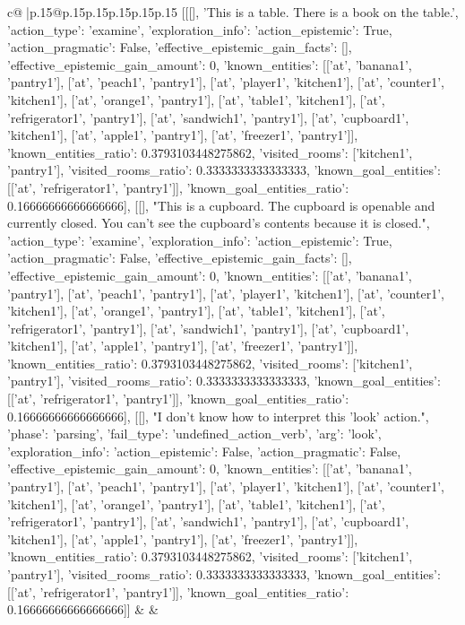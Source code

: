 \documentclass{article}
\begin{document}
{\begin{supertabular}{c@{$\;$}|p{.15\linewidth}@{}p{.15\linewidth}p{.15\linewidth}p{.15\linewidth}p{.15\linewidth}p{.15\linewidth}}
{{{	 [[[], 'This is a table. There is a book on the table.', {'action_type': 'examine', 'exploration_info': {'action_epistemic': True, 'action_pragmatic': False, 'effective_epistemic_gain_facts': [], 'effective_epistemic_gain_amount': 0, 'known_entities': [['at', 'banana1', 'pantry1'], ['at', 'peach1', 'pantry1'], ['at', 'player1', 'kitchen1'], ['at', 'counter1', 'kitchen1'], ['at', 'orange1', 'pantry1'], ['at', 'table1', 'kitchen1'], ['at', 'refrigerator1', 'pantry1'], ['at', 'sandwich1', 'pantry1'], ['at', 'cupboard1', 'kitchen1'], ['at', 'apple1', 'pantry1'], ['at', 'freezer1', 'pantry1']], 'known_entities_ratio': 0.3793103448275862, 'visited_rooms': ['kitchen1', 'pantry1'], 'visited_rooms_ratio': 0.3333333333333333, 'known_goal_entities': [['at', 'refrigerator1', 'pantry1']], 'known_goal_entities_ratio': 0.16666666666666666}}], [[], "This is a cupboard. The cupboard is openable and currently closed. You can't see the cupboard's contents because it is closed.", {'action_type': 'examine', 'exploration_info': {'action_epistemic': True, 'action_pragmatic': False, 'effective_epistemic_gain_facts': [], 'effective_epistemic_gain_amount': 0, 'known_entities': [['at', 'banana1', 'pantry1'], ['at', 'peach1', 'pantry1'], ['at', 'player1', 'kitchen1'], ['at', 'counter1', 'kitchen1'], ['at', 'orange1', 'pantry1'], ['at', 'table1', 'kitchen1'], ['at', 'refrigerator1', 'pantry1'], ['at', 'sandwich1', 'pantry1'], ['at', 'cupboard1', 'kitchen1'], ['at', 'apple1', 'pantry1'], ['at', 'freezer1', 'pantry1']], 'known_entities_ratio': 0.3793103448275862, 'visited_rooms': ['kitchen1', 'pantry1'], 'visited_rooms_ratio': 0.3333333333333333, 'known_goal_entities': [['at', 'refrigerator1', 'pantry1']], 'known_goal_entities_ratio': 0.16666666666666666}}], [[], "I don't know how to interpret this 'look' action.", {'phase': 'parsing', 'fail_type': 'undefined_action_verb', 'arg': 'look', 'exploration_info': {'action_epistemic': False, 'action_pragmatic': False, 'effective_epistemic_gain_amount': 0, 'known_entities': [['at', 'banana1', 'pantry1'], ['at', 'peach1', 'pantry1'], ['at', 'player1', 'kitchen1'], ['at', 'counter1', 'kitchen1'], ['at', 'orange1', 'pantry1'], ['at', 'table1', 'kitchen1'], ['at', 'refrigerator1', 'pantry1'], ['at', 'sandwich1', 'pantry1'], ['at', 'cupboard1', 'kitchen1'], ['at', 'apple1', 'pantry1'], ['at', 'freezer1', 'pantry1']], 'known_entities_ratio': 0.3793103448275862, 'visited_rooms': ['kitchen1', 'pantry1'], 'visited_rooms_ratio': 0.3333333333333333, 'known_goal_entities': [['at', 'refrigerator1', 'pantry1']], 'known_goal_entities_ratio': 0.16666666666666666}}]] 
	  } 
	   } 
	   } 
	 & & \\ 
 


\end{supertabular}}
\end{document}
